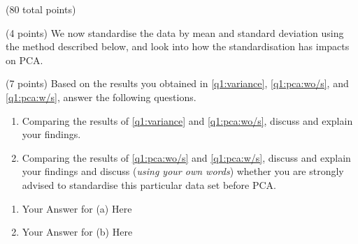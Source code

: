 \documentclass[12pt]{article}
\begin{document}
\begin{question}{(80 total points) \qOneTitle}
\begin{subquestion}{(4 points) %
    We now standardise the data by mean and standard deviation using the method described below, and look into how the standardisation has impacts on PCA.
  }
\end{subquestion}

\begin{subquestion}{(7 points)
    Based on the results you obtained in \ref{q1:variance}, \ref{q1:pca:wo/s}, and \ref{q1:pca:w/s}, answer the following questions.
  }
  \begin{enumerate}\NARROWITEM
  \item Comparing the results of \ref{q1:variance} and \ref{q1:pca:wo/s}, discuss and explain your findings.
  \item Comparing the results of \ref{q1:pca:wo/s} and \ref{q1:pca:w/s}, discuss and explain your findings and discuss ({\em using your own words}) whether you are strongly advised to standardise this particular data set before PCA.
  \end{enumerate}
   

  \begin{answerbox}{0.35\textheight}
    \begin{enumerate}
    \item Your Answer for (a) Here
    \item Your Answer for (b) Here
    \end{enumerate}
  \end{answerbox}
  

  
\end{subquestion}


\end{question}
\end{document}
